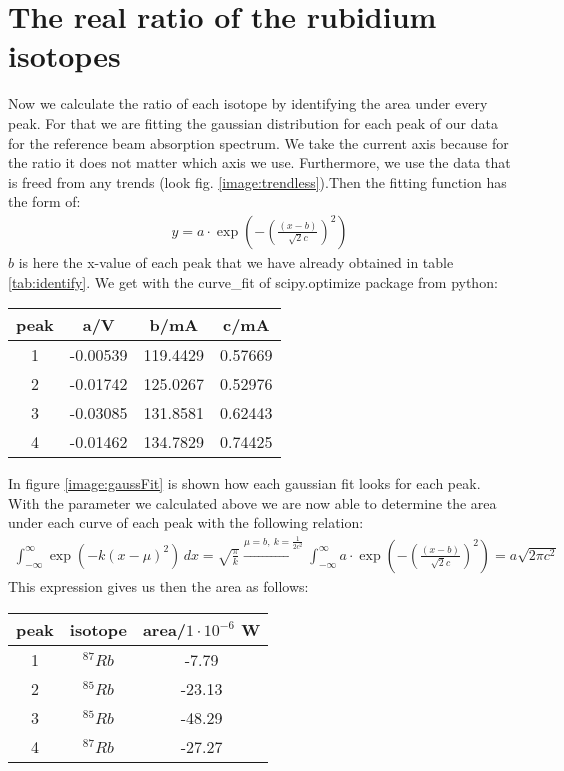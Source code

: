 \section{The real ratio of the rubidium isotopes}
\label{sec:ratio}
Now we calculate the ratio of each isotope by identifying the area under every peak. For that we are fitting the gaussian distribution for each peak of our data for the reference beam absorption spectrum. We take the current axis because for the ratio it does not matter which axis we use. Furthermore, we use the data that is freed from any trends (look fig. \ref{image:trendless}).Then the fitting function has the form of:
\begin{gather}
    y = a\cdot\exp(-\left(\frac{(x-b)}{\sqrt{2}c}\right)^2)
    \label{eq:gaussFit}
\end{gather}
$b$ is here the x-value of each peak that we have already obtained in table \ref{tab:identify}. We get with the curve_fit of scipy.optimize package from python:
\begin{center}
    \begin{tabular}{c | c c c}
        peak & a/V & b/mA & c/mA\\
        \hline
        1 &  -0.00539 & 119.4429 & 0.57669\\
        2 &  -0.01742 & 125.0267 & 0.52976\\
        3 &  -0.03085 & 131.8581 & 0.62443\\
        4 &  -0.01462 & 134.7829 & 0.74425\\
    \end{tabular}
\end{center}
In figure \ref{image:gaussFit} is shown how each gaussian fit looks for each peak.\\
With the parameter we calculated above we are now able to determine the area under each curve of each peak with the following relation:
\begin{gather}
    \int^{\infty}_{-\infty}\exp(-k(x-\mu)^2)\,dx = \sqrt{\frac{\pi}{k}} \xrightarrow{\mu = b,~k = \frac{1}{2c^2}}\int^{\infty}_{-\infty}a\cdot\exp(-\left(\frac{(x-b)}{\sqrt{2}c}\right)^2) = a \sqrt{2\pi c^2}
\end{gather}
This expression gives us then the area as follows:
\begin{center}
    \begin{tabular}{c | c | c}
        peak & isotope & area/$1\cdot 10^{-6}$ W\\
        \hline
        1 & $^{87}Rb$ &  -7.79 \\
        2 & $^{85}Rb$ & -23.13 \\
        3 & $^{85}Rb$ & -48.29 \\
        4 & $^{87}Rb$ & -27.27 \\
    \end{tabular}
\end{center}
